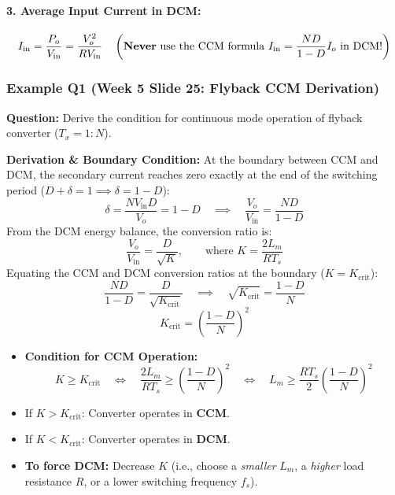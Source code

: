 \paragraph{3. Average Input Current in DCM:}
\begin{equation}
I_{\mathrm{in}} = \frac{P_o}{V_{\mathrm{in}}} = \frac{V_o^2}{R V_{\mathrm{in}}} \quad \left(\text{\textbf{Never}} \text{ use the CCM formula } I_{\mathrm{in}} = \frac{N D}{1-D} I_o \text{ in DCM!}\right)
\end{equation}

\subsubsection{Example Q1 (Week 5 Slide 25: Flyback CCM Derivation)}
\textbf{Question:} Derive the condition for continuous mode operation of flyback converter ($T_x = 1:N$).

\textbf{Derivation \& Boundary Condition:}
At the boundary between CCM and DCM, the secondary current reaches zero exactly at the end of the switching period ($D + \delta = 1 \implies \delta = 1 - D$):
\[
\delta = \frac{N V_{\mathrm{in}} D}{V_o} = 1 - D \quad\implies\quad \frac{V_o}{V_{\mathrm{in}}} = \frac{N D}{1 - D}
\]
From the DCM energy balance, the conversion ratio is:
\[
\frac{V_o}{V_{\mathrm{in}}} = \frac{D}{\sqrt{K}}, \qquad \text{where } K = \frac{2 L_m}{R T_s}
\]
Equating the CCM and DCM conversion ratios at the boundary ($K = K_{\mathrm{crit}}$):
\[
\frac{N D}{1 - D} = \frac{D}{\sqrt{K_{\mathrm{crit}}}} \quad\implies\quad \sqrt{K_{\mathrm{crit}}} = \frac{1-D}{N}
\]
\begin{equation}
K_{\mathrm{crit}} = \left(\frac{1 - D}{N}\right)^2
\end{equation}
\begin{itemize}
  \item \textbf{Condition for CCM Operation:}
  \begin{equation}
  K \ge K_{\mathrm{crit}} \quad\iff\quad \frac{2 L_m}{R T_s} \ge \left(\frac{1-D}{N}\right)^2 \quad\iff\quad L_m \ge \frac{R T_s}{2}\left(\frac{1-D}{N}\right)^2
  \end{equation}
  \item If $K > K_{\mathrm{crit}}$: Converter operates in \textbf{CCM}.
  \item If $K < K_{\mathrm{crit}}$: Converter operates in \textbf{DCM}.
  \item \textbf{To force DCM:} Decrease $K$ (i.e., choose a \emph{smaller} $L_m$, a \emph{higher} load resistance $R$, or a lower switching frequency $f_s$).
\end{itemize}

